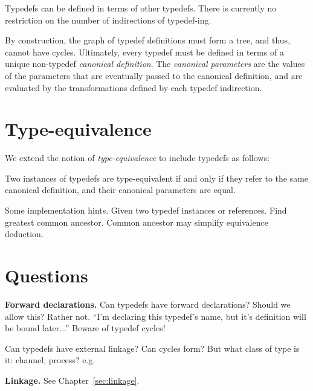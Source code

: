 Typedefs can be defined in terms of other typedefs.  
There is currently no restriction on the number of indirections
of typedef-ing.  

By construction, the graph of typedef definitions must form a tree,
and thus, cannot have cycles.  
Ultimately, every typedef must be defined in terms of a 
unique non-typedef \emph{canonical definition}.  
The \emph{canonical parameters} are the values of the 
parameters that are eventually passed to the canonical definition, 
and are evaluated by the transformations defined by each typedef indirection.  

\section{Type-equivalence}
\label{sec:typedefs:equivalence}


We extend the notion of \emph{type-equivalence} to include typedefs as follows:

Two instances of typedefs are type-equivalent if and only if
they refer to the same canonical definition, and their canonical 
parameters are equal.  

Some implementation hints.
Given two typedef instances or references.  
Find greatest common ancestor.  
Common ancestor may simplify equivalence deduction.  


\section{Questions}
\label{sec:typedefs:questions}

\textbf{Forward declarations.}
Can typedefs have forward declarations?  Should we allow this?  Rather not.
``I'm declaring this typedef's name, but it's definition will be bound
later...''
Beware of typedef cycles!

Can typedefs have external linkage?  Can cycles form?
But what class of type is it: channel, process?
e.g. 



\medskip
\textbf{Linkage.}  See Chapter~\ref{sec:linkage}.  


